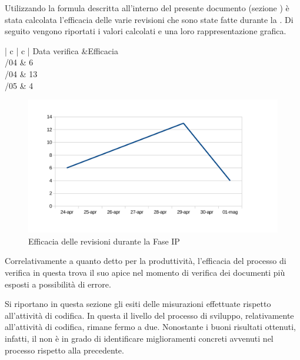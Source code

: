 	Utilizzando la formula descritta all'interno del presente documento (sezione ) è stata calcolata l'efficacia delle varie revisioni che sono state fatte durante la . Di seguito vengono riportati i valori calcolati e una loro rappresentazione grafica.
	\begin{table}[H]
		\centering
		\begin{tabu}{| c | c |}
		\hline
		Data verifica &Efficacia\\ \hline {}/04 & 6 \\ /04 & 13\\ /05 & 4 \\ \hline		
		\end{tabu}
		\caption{Efficacia delle revisioni durante la fase IP}
	\end{table}
	\begin{figure}[H]
		\centering
		\includegraphics[width=12cm]{PianoDiQualifica/Pics/EfficaciaRevisioniFaseIP.pdf}
		\caption{Efficacia delle revisioni durante la Fase IP}
	\end{figure}

	Correlativamente a quanto detto per la produttività, l'efficacia del processo di verifica in questa  trova il suo apice nel momento di verifica dei documenti più esposti a possibilità di errore.
	
		Si riportano in questa sezione gli esiti delle misurazioni effettuate rispetto all'attività di codifica.
		In questa  il livello  del processo di sviluppo, relativamente all'attività di codifica, rimane fermo a due. Nonostante i buoni risultati ottenuti, infatti, il  non è in grado di identificare miglioramenti concreti avvenuti nel processo rispetto alla  precedente.
		
